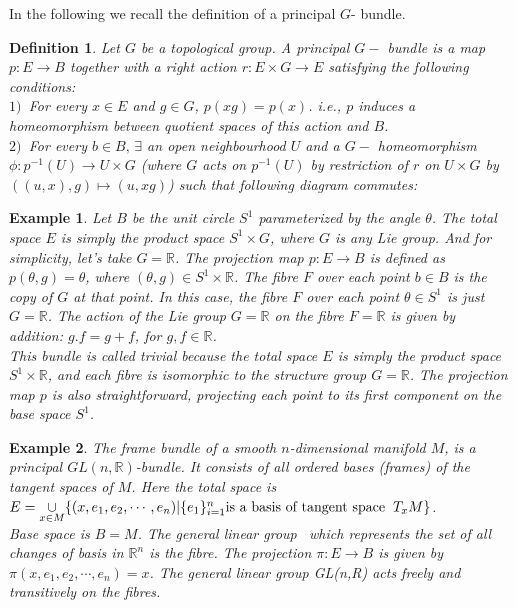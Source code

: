 \documentclass{amsart}
\theoremstyle{plain}
\newtheorem{exam}{Example}
\newtheorem{defn}{Definition}
\begin{document}
	
 In the following we recall the definition of a principal $G$- bundle.
	\begin{defn} 
		Let $G$ be a topological group. A principal $G-$ bundle is a map $p: E \rightarrow B$ together with a right action $r: E \times G \rightarrow E$ satisfying the following conditions:\\
		$ 1)\, $ For every $ x \in E $ and $g \in G$, $p(xg) = p(x)$. i.e., $p$ induces a homeomorphism between quotient spaces of this action and $B$.\\
		$2)\, $ For every $b \in B, \, \exists $ an open neighbourhood $U$ and a $G- $ homeomorphism $\phi : p^{-1}(U) \rightarrow U \times G$ (where $G$ acts on $p^{-1}(U)$ by restriction of $r$ on $U \times G$ by $((u,x),g)\longmapsto (u, xg)$) such that following diagram commutes:
		\begin{center}  
		\end{center}
	\end{defn}
	\begin{exam}
		Let $B$ be the unit circle $S^1$ parameterized by the angle $\theta$. The total space $E$ is simply the product space $S^1 \times G$, where 
		$G$ is any Lie group. And for simplicity, let's take $G = \mathbb{R}$. The projection map $p : E \rightarrow B$ is defined as $p(\theta, g) = \theta$, where $(\theta, g) \in S^1 \times \mathbb{R}$. The fibre $F$ over each point $b\in B$ is the copy of 
		$G$ at that point.
		In this case, the fibre $F$ over each point 
		$ \theta \in S^1$ is just $G = \mathbb{R}$. The action of the Lie group $G = \mathbb{R}$ on the fibre $F = \mathbb{R}$ is given by addition: $g.f = g + f $, for $g, f \in \mathbb{R}$.\\
		This bundle is called trivial because the total space $E$ is simply the product space $S^1 \times \mathbb{R}$, and each fibre is isomorphic to the structure group $G = \mathbb{R}$. The projection map $p$ is also straightforward, projecting each point to its first component on the base space $S^1$.
	\end{exam}
	\begin{exam}
		The frame bundle of a smooth $n$-dimensional manifold $M$, is a principal $GL(n,\mathbb{R})$-bundle. It consists of all ordered bases (frames) of the tangent spaces of $M$.
		Here the total space is\\ $E = \underset{x\in M}{\cup}\{(x, e_1, e_2, \cdots, e_n)| \{e_1\}_{i=1}^n \textnormal{is a basis of tangent space} \hspace{2mm} T_xM\}$.\\
		Base space is $B = M$. The general linear group \, which represents the set of all changes of basis in $\mathbb{R}^n$ is the fibre. The projection $\pi : E \rightarrow B$ is given by $\pi(x, e_1, e_2, \cdots, e_n)=x$. The general linear group GL(n,R) acts freely and transitively on the fibres. 
	\end{exam}
 
\end{document}
